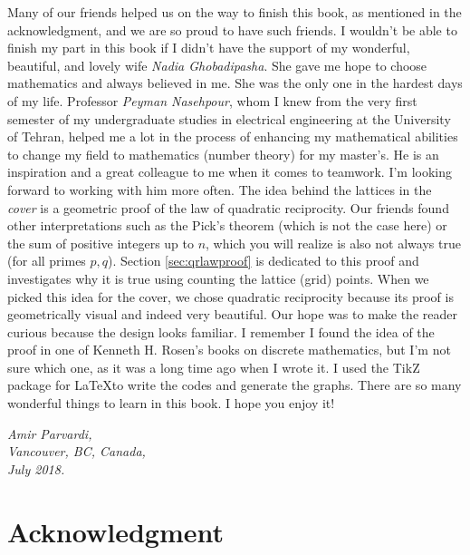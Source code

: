 \documentclass[leqno,14pt,DIV=calc,toc=index]{scrbook}
\begin{document}
\vspace{0.3cm}
Many of our friends helped us on the way to finish this book, as mentioned in the acknowledgment, and we are so proud to have such friends. I wouldn't be able to finish my part in this book if I didn't have the support of my wonderful, beautiful, and lovely wife \textit{Nadia Ghobadipasha}. She gave me hope to choose mathematics and always believed in me. She was the only one in the hardest days of my life.
\vspace{0.3cm}
Professor \textit{Peyman Nasehpour}, whom I knew from the very first semester of my undergraduate studies in electrical engineering at the University of Tehran, helped me a lot in the process of enhancing my mathematical abilities to change my field to mathematics (number theory) for my master's.  He is an inspiration and a great colleague to me when it comes to teamwork. I'm looking forward to working with him more often.
\vspace{0.3cm}
The idea behind the lattices in the \textit{cover} is a geometric proof of the law of quadratic reciprocity. Our friends found other interpretations such as the Pick's theorem (which is not the case here) or the sum of positive integers up to $n$, which you will realize is also not always true (for all primes $p,q$). Section \eqref{sec:qrlawproof} is dedicated to this proof and investigates why it is true using counting the lattice (grid) points. When we picked this idea for the cover, we chose quadratic reciprocity because its proof is geometrically visual and indeed very beautiful. Our hope was to make the reader curious because the design looks familiar. I remember I found the idea of the proof in one of Kenneth H. Rosen's books on discrete mathematics, but I'm not sure which one, as it was a long time ago when I wrote it. I used the TikZ package for \LaTeX to write the codes and generate the graphs.
\vspace{0.3cm}
There are so many wonderful things to learn in this book. I hope you enjoy it!
\begin{flushright}
	\itshape Amir Parvardi,\\
	Vancouver, BC, Canada,\\
	July 2018.
\end{flushright}

\newpage

\section*{Acknowledgment}
\end{document}
